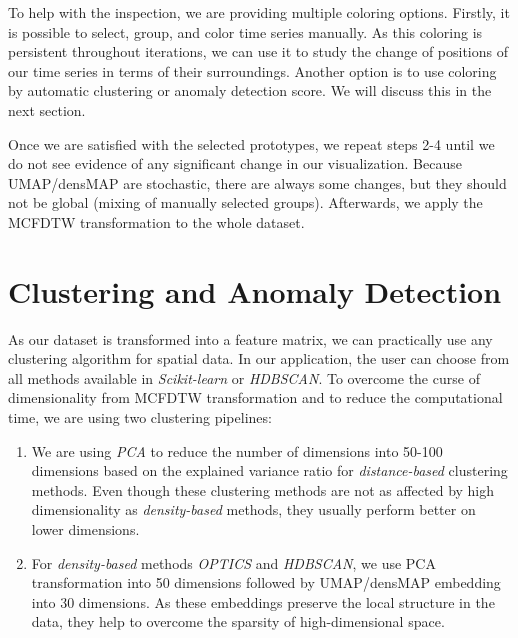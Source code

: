 To help with the inspection, we are providing multiple coloring options. Firstly, it is possible to select, group, and color time series manually. As this coloring is persistent throughout iterations, we can use it to study the change of positions of our time series in terms of their surroundings. Another option is to use coloring by automatic clustering or anomaly detection score. We will discuss this in the next section.

Once we are satisfied with the selected prototypes, we repeat steps 2-4 until we do not see evidence of any significant change in our visualization. Because UMAP/densMAP are stochastic, there are always some changes, but they should not be global (mixing of manually selected groups). Afterwards, we apply the MCFDTW transformation to the whole dataset.

\section{Clustering and Anomaly Detection}
As our dataset is transformed into a feature matrix, we can practically use any clustering algorithm for spatial data. In our application, the user can choose from all methods available in \textit{Scikit-learn} or \textit{HDBSCAN}. To overcome the curse of dimensionality from MCFDTW transformation and to reduce the computational time, we are using two clustering pipelines:
\begin{enumerate}
    \item We are using \textit{PCA} to reduce the number of dimensions into 50-100 dimensions based on the explained variance ratio for \textit{distance-based} clustering methods. Even though these clustering methods are not as affected by high dimensionality as \textit{density-based} methods, they usually perform better on lower dimensions.
    \item For \textit{density-based} methods \textit{OPTICS} and \textit{HDBSCAN}, we use PCA transformation into 50 dimensions followed by UMAP/densMAP embedding into 30 dimensions. As these embeddings preserve the local structure in the data, they help to overcome the sparsity of high-dimensional space.
\end{enumerate}

